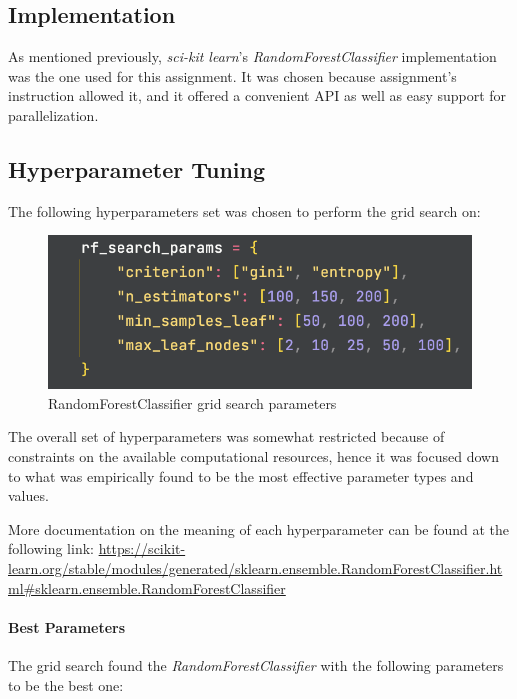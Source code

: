 \subsection{Implementation}

As mentioned previously, \textit{sci-kit learn}'s \textit{RandomForestClassifier} implementation was the one used for this assignment. It was chosen because assignment's instruction allowed it, and it offered a convenient API as well as easy support for parallelization.

\subsection{Hyperparameter Tuning}

The following hyperparameters set was chosen to perform the grid search on:

\begin{figure}[h]
    \centering
    \includegraphics[scale=0.7]{images/exp-results/rf/rf-params.png}
    \caption{RandomForestClassifier grid search parameters}
    \label{fig:exp_res_rf_params}
\end{figure}

The overall set of hyperparameters was somewhat restricted because of constraints on the available computational resources, hence it was focused down to what was empirically found to be the most effective parameter types and values.

More documentation on the meaning of each hyperparameter can be found at the following link: \url{https://scikit-learn.org/stable/modules/generated/sklearn.ensemble.RandomForestClassifier.html#sklearn.ensemble.RandomForestClassifier}

\paragraph{Best Parameters} The grid search found the \textit{RandomForestClassifier} with the following parameters to be the best one:

